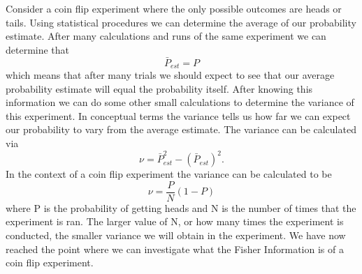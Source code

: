 \documentclass[twocolumn]{article}
\begin{document}
Consider a coin flip experiment where the only possible outcomes are heads or tails. Using statistical procedures we can determine the average of our probability estimate. After many calculations and runs of the same experiment we can determine that
\begin{equation} \label{eq:39}
\bar{P}_{est}=P
\end{equation}
which means that after many trials we should expect to see that our average probability estimate will equal the probability itself. After knowing this information we can do some other small calculations to determine the variance of this experiment. In conceptual terms the variance tells us how far we can expect our probability to vary from the average estimate. The variance can be calculated via
\begin{equation} \label{eq:40}
\nu=\bar{P}^2_{est}-(\bar{P}_{est})^2.
\end{equation}
In the context of a coin flip experiment the variance can be calculated to be
\begin{equation} \label{eq:41}
\nu=\frac{P}{N}(1-P)
\end{equation}
where P is the probability of getting heads and N is the number of times that the experiment is ran. The larger value of N, or how many times the experiment is conducted, the smaller variance we will obtain in the experiment. We have now reached the point where we can investigate what the Fisher Information is of a coin flip experiment.
\end{document}

